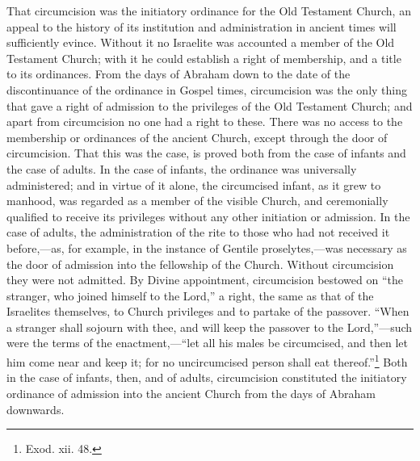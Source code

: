 \documentclass[english,]{book}
\begin{document}
That circumcision was the initiatory ordinance for the Old Testament Church, an appeal to the history of its institution and administration in ancient times will sufficiently evince. Without it no Israelite was accounted a member of the Old Testament Church; with it he could establish a right of membership, and a title to its ordinances. From the days of Abraham down to the date of the discontinuance of the ordinance in Gospel times, circumcision was the only thing that gave a right of admission to the privileges of the Old Testament Church; and apart from circumcision no one had a right to these. There was no access to the membership or ordinances of the ancient Church, except through the door of circumcision. That this was the case, is proved both from the case of infants and the case of adults. In the case of infants, the ordinance was universally administered; and in virtue of it alone, the circumcised infant, as it grew to manhood, was regarded as a member of the visible Church, and ceremonially qualified to receive its privileges without any other initiation or admission. In the case of adults, the administration of the rite to those who had not received it before,---as, for example, in the instance of Gentile proselytes,---was necessary as the door of admission into the fellowship of the Church. Without circumcision they were not admitted. By Divine appointment, circumcision bestowed on ``the stranger, who joined himself to the Lord,'' a right, the same as that of the Israelites themselves, to Church privileges and to partake of the passover. ``When a stranger shall sojourn with thee, and will keep the passover to the Lord,''---such were the terms of the enactment,---``let all his males be circumcised, and then let him come near and keep it; for no uncircumcised person shall eat thereof.''\footnote{Exod. xii. 48.} Both in the case of infants, then, and of adults, circumcision constituted the initiatory ordinance of admission into the ancient Church from the days of Abraham downwards.
\end{document}
